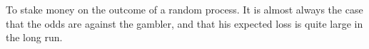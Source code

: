 To stake money on the outcome of a random process.
It is almost always the case that the odds are against
the gambler, and that his expected loss is quite large
in the long run.